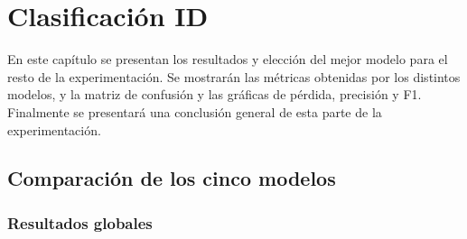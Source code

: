 %

\chapter{Clasificación ID}\label{cap:clasificacion-id}

En este capítulo se presentan los resultados y elección del mejor modelo para el resto de la experimentación. Se mostrarán las métricas obtenidas por los distintos modelos, y la matriz de confusión y las gráficas de pérdida, precisión y F1. Finalmente se presentará una conclusión general de esta parte de la experimentación.
\section{Comparación de los cinco modelos}\label{sec:comparacion-modelos}

\subsection{Resultados globales}\label{sec:modelos-global}



